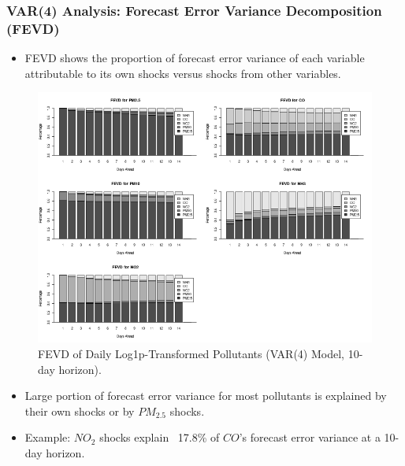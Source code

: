 \documentclass[svgnames, 12pt]{beamer}
\begin{document}
\begin{frame}
    \frametitle{VAR(4) Analysis: Forecast Error Variance Decomposition (FEVD)}
    \begin{itemize}
        \item FEVD shows the proportion of forecast error variance of each variable attributable to its own shocks versus shocks from other variables.
    \end{itemize}
    \begin{figure}
        \includegraphics[width=0.9\linewidth]{../analysis/assets/fevd_delhi.png}
        \caption{FEVD of Daily Log1p-Transformed Pollutants (VAR(4) Model, 10-day horizon).}
        \label{fig:fevd_delhi_pres}
    \end{figure}
    \begin{itemize}
        \item \footnotesize Large portion of forecast error variance for most pollutants is explained by their own shocks or by $PM_{2.5}$ shocks.
        \item \footnotesize Example: $NO_2$ shocks explain ~17.8\% of $CO$'s forecast error variance at a 10-day horizon.
    \end{itemize}
\end{frame}
\end{document}
